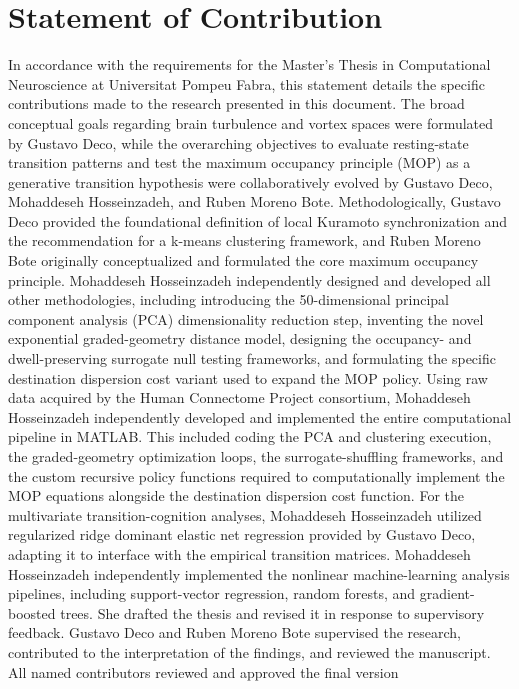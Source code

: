 \documentclass[12pt,a4paper]{report}
\begin{document}
\chapter{Statement of Contribution}
In accordance with the requirements for the Master's Thesis in Computational Neuroscience at Universitat Pompeu Fabra, this statement details the specific contributions made to the research presented in this document. The broad conceptual goals regarding brain turbulence and vortex spaces were formulated by Gustavo Deco, while the overarching objectives to evaluate resting-state transition patterns and test the maximum occupancy principle (MOP) as a generative transition hypothesis were collaboratively evolved by Gustavo Deco, Mohaddeseh Hosseinzadeh, and Ruben Moreno Bote. Methodologically, Gustavo Deco provided the foundational definition of local Kuramoto synchronization and the recommendation for a k-means clustering framework, and Ruben Moreno Bote originally conceptualized and formulated the core maximum occupancy principle. Mohaddeseh Hosseinzadeh independently designed and developed all other methodologies, including introducing the 50-dimensional principal component analysis (PCA) dimensionality reduction step, inventing the novel exponential graded-geometry distance model, designing the occupancy- and dwell-preserving surrogate null testing frameworks, and formulating the specific destination dispersion cost variant used to expand the MOP policy. Using raw data acquired by the Human Connectome Project consortium, Mohaddeseh Hosseinzadeh independently developed and implemented the entire computational pipeline in MATLAB. This included coding the PCA and clustering execution, the graded-geometry optimization loops, the surrogate-shuffling frameworks, and the custom recursive policy functions required to computationally implement the MOP equations alongside the destination dispersion cost function. For the multivariate transition-cognition analyses, Mohaddeseh Hosseinzadeh utilized regularized ridge dominant elastic net regression provided by Gustavo Deco, adapting it to interface with the empirical transition matrices. Mohaddeseh Hosseinzadeh independently implemented the nonlinear machine-learning analysis pipelines, including support-vector regression, random forests, and gradient-boosted trees. She drafted the thesis and revised it in response to supervisory feedback. Gustavo Deco and Ruben Moreno Bote supervised the research, contributed to the interpretation of the findings, and reviewed the manuscript. All named contributors reviewed and approved the final version
\end{document}
